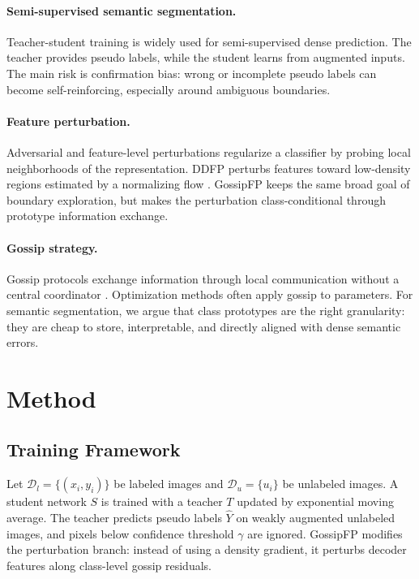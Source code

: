 \documentclass[10pt,twocolumn,letterpaper]{article}
\begin{document}
\paragraph{Semi-supervised semantic segmentation.}
Teacher-student training is widely used for semi-supervised dense prediction. The teacher provides pseudo labels, while the student learns from augmented inputs. The main risk is confirmation bias: wrong or incomplete pseudo labels can become self-reinforcing, especially around ambiguous boundaries.

\paragraph{Feature perturbation.}
Adversarial and feature-level perturbations regularize a classifier by probing local neighborhoods of the representation. DDFP perturbs features toward low-density regions estimated by a normalizing flow \cite{wang2024ddfp,dinh2017realnvp}. GossipFP keeps the same broad goal of boundary exploration, but makes the perturbation class-conditional through prototype information exchange.

\paragraph{Gossip strategy.}
Gossip protocols exchange information through local communication without a central coordinator \cite{kempe2003gossip}. Optimization methods often apply gossip to parameters. For semantic segmentation, we argue that class prototypes are the right granularity: they are cheap to store, interpretable, and directly aligned with dense semantic errors.

\section{Method}

\subsection{Training Framework}

Let $\mathcal{D}_l=\{(x_i,y_i)\}$ be labeled images and $\mathcal{D}_u=\{u_i\}$ be unlabeled images. A student network $S$ is trained with a teacher $T$ updated by exponential moving average. The teacher predicts pseudo labels $\hat{Y}$ on weakly augmented unlabeled images, and pixels below confidence threshold $\gamma$ are ignored. GossipFP modifies the perturbation branch: instead of using a density gradient, it perturbs decoder features along class-level gossip residuals.
\end{document}
